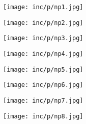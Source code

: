 \noindent
\texttt{[image: inc/p/np1.jpg]}

\newpage

\noindent
\texttt{[image: inc/p/np2.jpg]}

\newpage

\noindent
\noindent\texttt{[image: inc/p/np3.jpg]}

\newpage

\noindent
\texttt{[image: inc/p/np4.jpg]}

\newpage

\noindent
\texttt{[image: inc/p/np5.jpg]}

\newpage

\noindent
\texttt{[image: inc/p/np6.jpg]}

\newpage

\noindent
\texttt{[image: inc/p/np7.jpg]}

\newpage

\noindent
\texttt{[image: inc/p/np8.jpg]}

\newpage